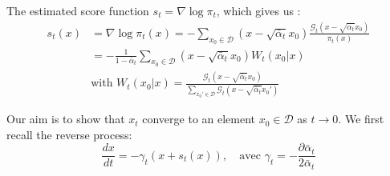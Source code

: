 \documentclass[a4paper,10pt]{article}
\begin{document}
The estimated score function $s_t = \nabla \log \pi_t$, which gives us 
:\begin{align*}
s_t(x) &= \nabla \log \pi_t(x) = -\sum\limits_{x_0  \in \mathcal{D}} (x - \sqrt{\bar \alpha_t}x_0) \frac{\mathcal{G}_t(x - \sqrt{\bar \alpha_t}x_0)}{\pi_t(x)} \\
&= -\frac{1}{1-\bar \alpha_t} \sum\limits_{x_0  \in \mathcal{D}} (x - \sqrt{\bar \alpha_t}x_0) W_t(x_0 | x) \\
& \text{with }W_t(x_0| x) = \frac{\mathcal{G}_t(x - \sqrt{ \bar \alpha_t}x_0)}{\sum\limits_{x_0'  \in \mathcal{D}} \mathcal{G}_t(x - \sqrt{\bar \alpha_t}x_0')}
\end{align*}

Our aim is to show that $x_t$ converge to an element $x_0 \in \mathcal{D}$ as $t \rightarrow 0$. We first recall the reverse process:
\begin{equation*}
    \frac{dx}{dt} =  -\gamma_t(x+s_t(x)), \quad \text{avec } \gamma_t = -\frac{\partial \bar \alpha_t}{2\bar \alpha_t} 
\end{equation*}
\end{document}

